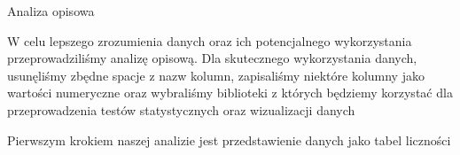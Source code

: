\documentclass[
]{article}
\newenvironment{Shaded}{\begin{snugshade}}{\end{snugshade}}
\newcommand{\CommentTok}[1]{\textcolor[rgb]{0.56,0.35,0.01}{\textit{#1}}}
\newcommand{\FunctionTok}[1]{\textcolor[rgb]{0.13,0.29,0.53}{\textbf{#1}}}
\newcommand{\NormalTok}[1]{#1}
\newcommand{\OtherTok}[1]{\textcolor[rgb]{0.56,0.35,0.01}{#1}}
\newcommand{\SpecialCharTok}[1]{\textcolor[rgb]{0.81,0.36,0.00}{\textbf{#1}}}
\newcommand{\StringTok}[1]{\textcolor[rgb]{0.31,0.60,0.02}{#1}}
\begin{document}
Analiza opisowa

W celu lepszego zrozumienia danych oraz ich potencjalnego wykorzystania
przeprowadziliśmy analizę opisową. Dla skutecznego wykorzystania danych,
usunęliśmy zbędne spacje z nazw kolumn, zapisaliśmy niektóre kolumny
jako wartości numeryczne oraz wybraliśmy biblioteki z których będziemy
korzystać dla przeprowadzenia testów statystycznych oraz wizualizacji
danych

\begin{Shaded}
\end{Shaded}

Pierwszym krokiem naszej analizie jest przedstawienie danych jako tabel
liczności
\end{document}
